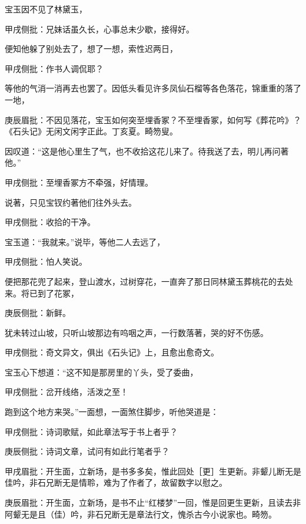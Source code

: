 \begin{parag}
    宝玉因不见了林黛玉，\begin{note}甲戌侧批：兄妹话虽久长，心事总未少歇，接得好。\end{note}便知他躲了别处去了，想了一想，索性迟两日，\begin{note}甲戌侧批：作书人调侃耶？\end{note}等他的气消一消再去也罢了。因低头看见许多凤仙石榴等各色落花，锦重重的落了一地，\begin{note}庚辰眉批：不因见落花，宝玉如何突至埋香冢？不至埋香冢，如何写《葬花吟》？《石头记》无闲文闲字正此。丁亥夏。畸笏叟。\end{note}因叹道：“这是他心里生了气，也不收拾这花儿来了。待我送了去，明儿再问著他。”\begin{note}甲戌侧批：至埋香冢方不牵强，好情理。\end{note}说著，只见宝钗约著他们往外头去。\begin{note}甲戌侧批：收拾的干净。\end{note}宝玉道：“我就来。”说毕，等他二人去远了，\begin{note}甲戌侧批：怕人笑说。\end{note}便把那花兜了起来，登山渡水，过树穿花，一直奔了那日同林黛玉葬桃花的去处来。将已到了花冢，\begin{note}庚辰侧批：新鲜。\end{note}犹未转过山坡，只听山坡那边有呜咽之声，一行数落著，哭的好不伤感。\begin{note}甲戌侧批：奇文异文，俱出《石头记》上，且愈出愈奇文。\end{note}宝玉心下想道：“这不知是那房里的丫头，受了委曲，\begin{note}甲戌侧批：岔开线络，活泼之至！\end{note}跑到这个地方来哭。”一面想，一面煞住脚步，听他哭道是：\begin{note}甲戌侧批：诗词歌赋，如此章法写于书上者乎？\end{note}\begin{note}庚辰侧批：诗词文章，试问有如此行笔者乎？\end{note}\begin{note}甲戌眉批：开生面，立新场，是书多多矣，惟此回处［更］生更新。非颦儿断无是佳吟，非石兄断无是情聆，难为了作者了，故留数字以慰之。\end{note}\begin{note}庚辰眉批：开生面，立新场，是书不止“红楼梦”一回，惟是回更生更新，且读去非阿颦无是且（佳）吟，非石兄断无是章法行文，愧杀古今小说家也。畸笏。\end{note}
\end{parag}


